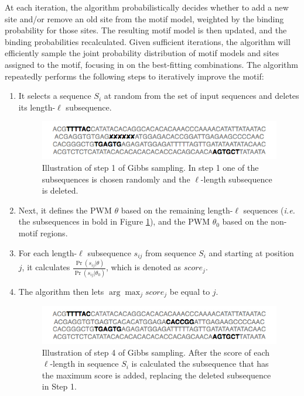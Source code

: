 At each iteration, the algorithm probabilistically decides whether to add a new site and/or remove an old site from the motif model, weighted by the binding probability for those sites. The resulting motif model is then updated, and the binding probabilities recalculated. Given sufficient iterations, the algorithm will efficiently sample the joint probability distribution of motif models and sites assigned to the motif, focusing in on the best-fitting combinations.  The algorithm repeatedly performs the following steps to iteratively improve the motif:
\begin{enumerate}
\item It selects a sequence $S_i$ at random from the set of input sequences and deletes its length-$\ell$ subsequence.
\begin{figure}[h!]
\begin{center}
 \includegraphics[width=\linewidth]{images/gibbs_example2}
\caption[Illustration of step 1 of Gibbs sampling. ]{Illustration of step 1 of Gibbs sampling.  In step 1 one of the subsequences is chosen randomly and the $\ell$-length subsequence is deleted.}
\label{fig:gibbs_example2}
\end{center}
\end{figure}
\item Next, it defines the PWM $\theta$ based on the remaining length-$\ell$ sequences ({\em i.e.} the subsequences in bold in Figure \ref{fig:gibbs_example2}), and the PWM $\theta_0$ based on the non-motif regions.
\item For each length-$\ell$ subsequence $s_{ij}$ from sequence $S_i$ and starting at position $j$, it calculates $\frac{\Pr(s_{ij} | \theta)}{\Pr(s_{ij} | \theta_0)}$, which is denoted as $score_j$.  
\item The algorithm then lets $\arg \max_{j} score_j$ be equal to $j$. 
\begin{figure}[h!]
\begin{center}
 \includegraphics[width=\linewidth]{images/gibbs_example3}
\caption[Illustration of step 4 of Gibbs sampling. ]{Illustration of step 4 of Gibbs sampling.  After the score of each $\ell$-length in sequence $S_i$ is calculated the subsequence that has the maximum score is added, replacing the deleted subsequence in Step 1.}
\label{fig:gibbs_example3}
\end{center}
\end{figure}
\end{enumerate} 

